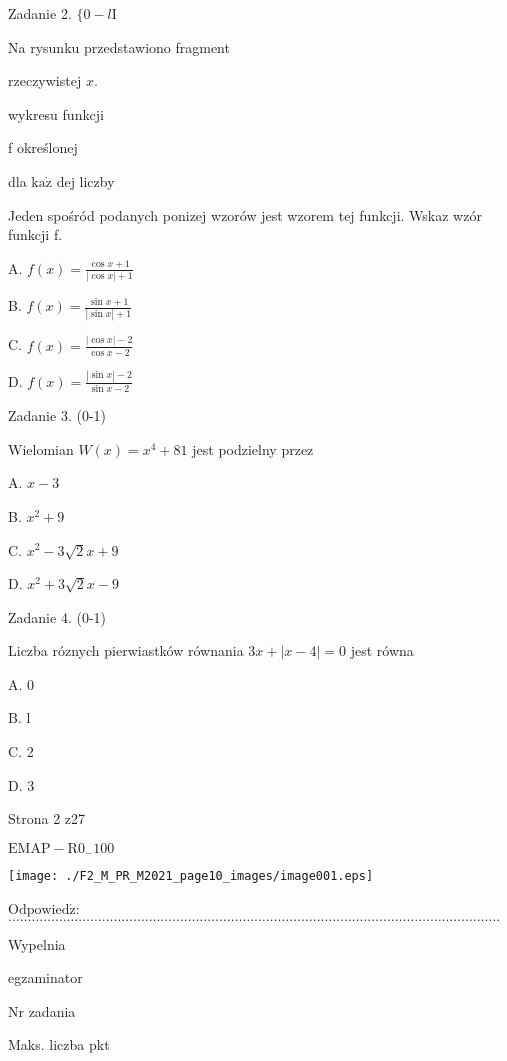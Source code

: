 \documentclass[a4paper,12pt]{article}
\begin{document}
Zadanie 2. $\{0-l\mathrm{I}$

Na rysunku przedstawiono fragment

rzeczywistej $x.$

wykresu funkcji

f określonej

dla $\mathrm{k}\mathrm{a}\dot{\mathrm{z}}$ dej liczby

Jeden spośród podanych ponizej wzorów jest wzorem tej funkcji. Wskaz wzór funkcji f.

A. $f(x)=\displaystyle \frac{\cos x+1}{|\cos x|+1}$

B. $f(x)=\displaystyle \frac{\sin x+1}{|\sin x|+1}$

C. $f(x)=\displaystyle \frac{|\cos x|-2}{\cos x-2}$

D. $f(x)=\displaystyle \frac{|\sin x|-2}{\sin x-2}$

Zadanie 3. (0-1)

Wielomian $W(x)=x^{4}+81$ jest podzielny przez

A. $x-3$

B. $x^{2}+9$

C. $x^{2}-3\sqrt{2}x+9$

D. $x^{2}+3\sqrt{2}x-9$

Zadanie 4. (0-1)

Liczba róznych pierwiastków równania $3x+|x-4|=0$ jest równa

A. 0

B. l

C. 2

D. 3

Strona 2 z27

$\mathrm{E}\mathrm{M}\mathrm{A}\mathrm{P}-\mathrm{R}0_{-}100$




\begin{center}
\texttt{[image: ./F2\_M\_PR\_M2021\_page10\_images/image001.eps]}
\end{center}
$\mathrm{O}\mathrm{d}\mathrm{p}\mathrm{o}\mathrm{w}\mathrm{i}\mathrm{e}\mathrm{d}\acute{\mathrm{z}}$:$\ldots\ldots\ldots\ldots\ldots\ldots\ldots\ldots\ldots\ldots\ldots\ldots\ldots\ldots\ldots\ldots\ldots\ldots\ldots\ldots\ldots\ldots\ldots\ldots\ldots\ldots\ldots\ldots\ldots\ldots\ldots\ldots\ldots\ldots\ldots\ldots\ldots\ldots\ldots\ldots\ldots\ldots$

Wypelnia

egzaminator

Nr zadania

Maks. liczba pkt
\end{document}
